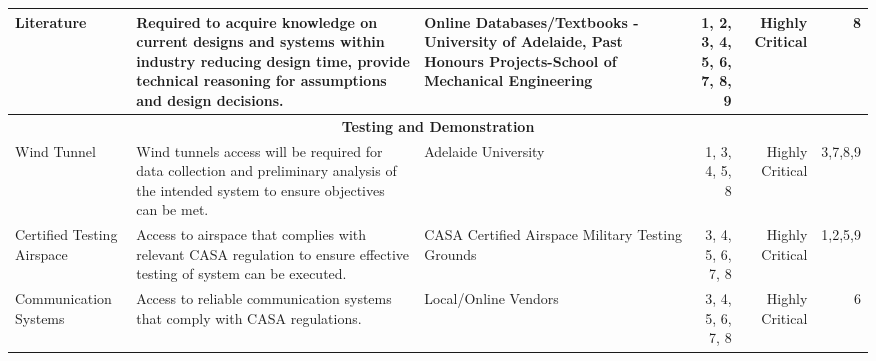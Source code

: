 \begin{table}[]
{\begin{tabular}{|p{4cm}|p{12cm}|p{8cm}|r|r|r|}
Literature                                 & Required to acquire knowledge on current designs and systems within industry reducing design time, provide technical reasoning for assumptions and design decisions.           & Online Databases/Textbooks - University of Adelaide, Past Honours Projects-School of Mechanical Engineering & 1, 2, 3, 4, 5, 6, 7, 8, 9                            & Highly Critical                           & 8                                          \\ \hline
\multicolumn{6}{|c|}{\textbf{Testing and Demonstration}}                                                                                                                                                                                                                                                                                                                                                                                                                            \\ \hline
Wind Tunnel                                & Wind tunnels access will be required for data collection and preliminary analysis of the intended system to ensure objectives can be met.                                       & Adelaide University                                                                                          & 1, 3, 4, 5, 8                                  & Highly Critical                           & 3,7,8,9                                    \\ \hline
Certified Testing Airspace                 & Access to airspace that complies with relevant CASA regulation to ensure effective testing of system can be executed.                                                          & CASA Certified Airspace Military Testing Grounds                                                              & 3, 4, 5, 6, 7, 8                               & Highly Critical                           & 1,2,5,9                                                               \\ \hline
Communication Systems                      & Access to reliable communication systems that comply with CASA regulations.                                                                                                   & Local/Online Vendors                                                                                         & 3, 4, 5, 6, 7, 8                               & Highly Critical                           & 6                                          \\ \hline

\end{tabular}}
\end{table}
